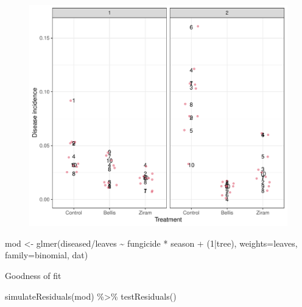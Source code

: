 \documentclass[
  letterpaper,
  DIV=11,
  numbers=noendperiod]{scrartcl}
\newenvironment{Shaded}{\begin{snugshade}}{\end{snugshade}}
\newcommand{\AttributeTok}[1]{\textcolor[rgb]{0.40,0.45,0.13}{#1}}
\newcommand{\DecValTok}[1]{\textcolor[rgb]{0.68,0.00,0.00}{#1}}
\newcommand{\FunctionTok}[1]{\textcolor[rgb]{0.28,0.35,0.67}{#1}}
\newcommand{\NormalTok}[1]{\textcolor[rgb]{0.00,0.23,0.31}{#1}}
\newcommand{\OtherTok}[1]{\textcolor[rgb]{0.00,0.23,0.31}{#1}}
\newcommand{\SpecialCharTok}[1]{\textcolor[rgb]{0.37,0.37,0.37}{#1}}
\begin{document}
\begin{figure}[H]

{\centering \includegraphics{in_field_files/figure-pdf/unnamed-chunk-4-1.pdf}

}

\end{figure}

\begin{Shaded}
\begin{Highlighting}[]
\NormalTok{mod }\OtherTok{\textless{}{-}} \FunctionTok{glmer}\NormalTok{(diseased}\SpecialCharTok{/}\NormalTok{leaves }\SpecialCharTok{\textasciitilde{}}\NormalTok{ fungicide }\SpecialCharTok{*}\NormalTok{ season }\SpecialCharTok{+}\NormalTok{ (}\DecValTok{1}\SpecialCharTok{|}\NormalTok{tree),}
             \AttributeTok{weights=}\NormalTok{leaves, }\AttributeTok{family=}\NormalTok{binomial, dat)}
\end{Highlighting}
\end{Shaded}

Goodness of fit

\begin{Shaded}
\begin{Highlighting}[]
\FunctionTok{simulateResiduals}\NormalTok{(mod) }\SpecialCharTok{\%\textgreater{}\%} \FunctionTok{testResiduals}\NormalTok{()}
\end{Highlighting}
\end{Shaded}
\end{document}
